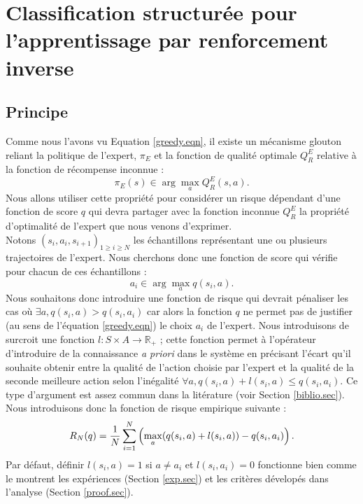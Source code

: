\documentclass[publibook-draft]{CAp2012}
\begin{document}
\section{Classification structurée pour l'apprentissage par renforcement inverse}
\subsection{Principe}
Comme nous l'avons vu Equation \eqref{greedy.eqn}, il existe un mécanisme glouton reliant la politique de l'expert, $\pi_E$ et la fonction de qualité optimale $Q^E_R$ relative à la fonction de récompense inconnue :
\begin{equation}
\pi_E(s) \in \arg\max_aQ^E_R(s,a).
\end{equation}
Nous allons utiliser cette propriété pour considérer un risque dépendant d'une fonction de score $q$ qui devra partager avec la fonction inconnue $Q^E_R$ la propriété d'optimalité de l'expert que nous venons d'exprimer.\\
Notons $(s_i,a_i,s_{i+1})_{1\geq i\geq N}$ les échantillons représentant une ou plusieurs trajectoires de l'expert. Nous cherchons donc une fonction de score qui vérifie pour chacun de ces échantillons :
\begin{equation}
\label{butLAFEM.eqn}
a_i \in \arg\max_aq(s_i,a).
\end{equation}
Nous souhaitons donc introduire une fonction de risque qui devrait pénaliser les cas où $\exists a, q(s_i,a)>q(s_i,a_i)$ car alors la fonction $q$ ne permet pas de justifier (au sens de l'équation \eqref{greedy.eqn}) le choix $a_i$ de l'expert. Nous introduisons de surcroit une fonction $l : S \times A \rightarrow \mathbb{R}_+$ ; cette fonction permet à l'opérateur d'introduire de la connaissance \emph{a priori} dans le système en précisant l'écart qu'il souhaite obtenir entre la qualité de l'action choisie par l'expert et la qualité de la seconde meilleure action selon l'inégalité $\forall a, q(s_i,a) + l(s_i,a) \leq q(s_i,a_i)$. Ce type d'argument est assez commun dans la litérature (voir Section \ref{biblio.sec}). Nous introduisons donc la fonction de risque empirique suivante :
  \begin{equation}
   R_N(q) = {1\over N} \sum_{i=1}^N\left(\max_{a}(q(s_i,a) + l(s_i,a)) - q(s_i,a_i) \right).
   \end{equation}
Par défaut, définir $l(s_i,a) = 1$ si $a\neq a_i$ et $l(s_i,a_i)=0$ fonctionne bien comme le montrent les expériences (Section \ref{exp.sec}) et les critères dévelopés dans l'analyse (Section \ref{proof.sec}).\\
\end{document}
